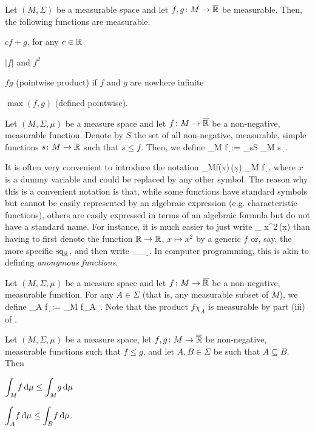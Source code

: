 \bl
\label{lem:measurable}
Let $(M,\Sigma)$ be a measurable space and let $f,g\colon M\to \overline{\mathbb{R}}$ be measurable. Then, the following functions are measurable.
\ben[label=(\roman*)]
\item $cf+g$, for any $c\in \mathbb{R}$
\item $|f|$ and $f^2$
\item $fg$ (pointwise product) if $f$ and $g$ are nowhere infinite
\item $\max(f,g)$ (defined pointwise).
\een
\el


\bd
Let $(M,\Sigma,\mu)$ be a measure space and let $f\colon M\to\overline{\mathbb{R}}$ be a non-negative, measurable function. Denote by $S$ the set of all non-negative, measurable, simple functions $s\colon M \to \mathbb{R}$ such that $s\leq f$. Then, we define
\bse
\int_M\! f\, \d \mu := \sup_{s\in S} \int_M\! s\, \d \mu.
\ese
\ed

\br
It is often very convenient to introduce the notation
\bse
\int_M\!f(x)\,\mu(\d x) \equiv \int_M\! f\, \d \mu,
\ese
where $x$ is a dummy variable and could be replaced by any other symbol. The reason why this is a convenient notation is that, while some functions have standard symbols but cannot be easily represented by an algebraic expression (e.g. characteristic functions), others are easily expressed in terms of an algebraic formula but do not have a standard name. For instance, it is much easier to just write
\bse
\int_{\R}  x^2\,\mu(\d x)
\ese
than having to first denote the function $\mathbb{R}\to\mathbb{R}$, $x\mapsto x^2$ by a generic $f$ or, say, the more specific $\mathrm{sq}_{\mathbb{R}}$, and then write 
\bse
\int_\R{}_{\R}\, \d \mu.
\ese
In computer programming, this is akin to defining \emph{anonymous functions}.
\er

\bd
Let $(M,\Sigma,\mu)$ be a measure space and let $f\colon M\to\overline{\mathbb{R}}$ be a non-negative, measurable function. For any $A\in \Sigma$ (that is, any measurable subset of $M$), we define
\bse
\int_A\! f\, \d \mu := \int_M\! f\chi_A\, \d \mu.
\ese
\ed
Note that the product $f\chi_A$ is measurable by part (iii) of .

\bl
\label{lem:intineq}
Let $(M,\Sigma,\mu)$ be a measure space, let $f,g\colon M\to\overline{\mathbb{R}}$ be non-negative, measurable functions such that $f\leq g$, and let $A,B\in \Sigma$ be such that $A\subseteq B$. Then
\ben[label=(\roman*)]
\item $\displaystyle \int_M\! f\, \mathrm{d} \mu \leq \int_M\! g\, \mathrm{d} \mu$
\item $\displaystyle \int_A\! f\, \mathrm{d} \mu \leq \int_B\! f\, \mathrm{d} \mu$.
\een
\el

